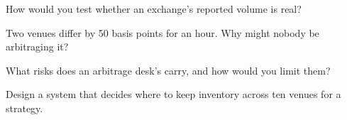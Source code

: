\begin{interviewq}\label{iq:m3:spot-markets:3}
How would you test whether an exchange's reported volume is real?
\end{interviewq}

\begin{interviewq}\label{iq:m3:spot-markets:4}
Two venues differ by 50 basis points for an hour. Why might nobody be arbitraging it?
\end{interviewq}

\begin{interviewq}\label{iq:m3:spot-markets:5}
What risks does an arbitrage desk's  carry, and how would you limit them?
\end{interviewq}

\begin{interviewq}\label{iq:m3:spot-markets:6}
Design a system that decides where to keep inventory across ten venues for a  strategy.
\end{interviewq}

